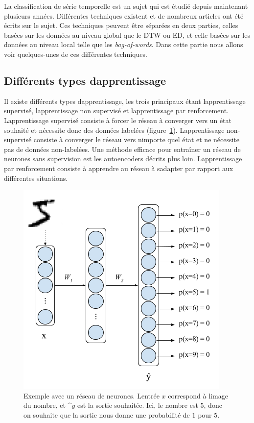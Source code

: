\documentclass[11pt,final,ENIB]{sdm}
\begin{document}
	La classification de s\'erie temporelle est un sujet qui est \'etudi\'e depuis maintenant plusieurs ann\'ees. Diff\'erentes techniques existent et de nombreux articles ont \'et\'e \'ecrits sur le sujet. Ces techniques peuvent \^etre s\'epar\'ees en deux parties, celles bas\'ees sur les donn\'ees au niveau global que le DTW ou ED, et celle bas\'ees sur les donn\'ees au niveau local telle que les \textit{bag-of-words}.
	Dans cette partie nous allons voir quelques-unes de ces diff\'erentes techniques.

	\subsection{Diff\'erents types d\textquotesingle apprentissage}
		Il existe diff\'erents types d\textquotesingle apprentissage, les trois principaux \'etant l\textquotesingle apprentissage supervis\'e, l\textquotesingle apprentissage non supervis\'e et l\textquotesingle apprentissage par renforcement.
		L\textquotesingle apprentissage supervis\'e consiste \`a forcer le r\'eseau \`a converger vers un \'etat souhait\'e et n\'ecessite donc des donn\'ees label\'ees (figure~\ref{fig:supervisedLearning}).
		L\textquotesingle apprentissage non-supervis\'e consiste \`a converger le r\'eseau vers n\textquotesingle importe quel \'etat et ne n\'ecessite pas de donn\'ees non-label\'ees. Une m\'ethode efficace pour entra\^iner un r\'eseau de neurones sans supervision est les autoencoders d\'ecrits plus loin.
		L\textquotesingle apprentissage par renforcement consiste \`a apprendre au r\'eseau \`a s\textquotesingle adapter par rapport aux diff\'erentes situations. 

		\begin{figure}[!ht]
			\centering
			\includegraphics[scale=0.4,natwidth=400,natheight=406]{figures/supervisedLearning.png}
			\caption{Exemple avec un r\'eseau de neurones. L\textquotesingle entr\'ee $x$ correspond \`a l\textquotesingle image du nombre, et $\^y$ est la sortie souhait\'ee. Ici, le nombre est $5$, donc on souhaite que la sortie nous donne une probabilit\'e de $1$ pour $5$.}
				\label{fig:supervisedLearning}
		\end{figure}
\end{document}
